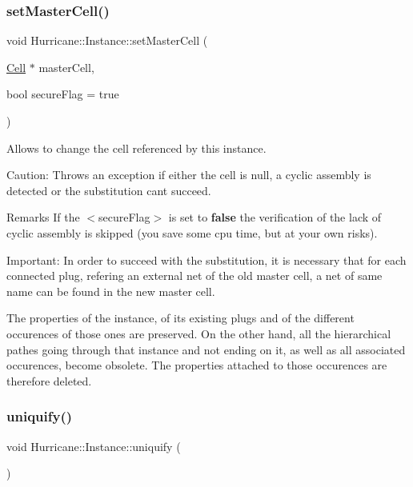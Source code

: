 \subsubsection{\texorpdfstring{set\+Master\+Cell()}{setMasterCell()}}
{\footnotesize\ttfamily void Hurricane\+::\+Instance\+::set\+Master\+Cell (\begin{DoxyParamCaption}\item[{\mbox{\hyperlink{classHurricane_1_1Cell}{Cell}} $\ast$}]{master\+Cell,  }\item[{bool}]{secure\+Flag = {\ttfamily true} }\end{DoxyParamCaption})}

Allows to change the cell referenced by this instance.

\begin{DoxyParagraph}{Caution\+: Throws an exception if either the cell is null, a cyclic }
assembly is detected or the substitution can\textquotesingle{}t succeed.
\end{DoxyParagraph}
\begin{DoxyRemark}{Remarks}
If the {\ttfamily $<$secure\+Flag$>$} is set to {\bfseries false} the verification of the lack of cyclic assembly is skipped (you save some cpu time, but at your own risks).
\end{DoxyRemark}
\begin{DoxyParagraph}{Important\+: In order to succeed with the substitution, it is necessary }
that for each connected plug, refering an external net of the old master cell, a net of same name can be found in the new master cell.
\end{DoxyParagraph}
The properties of the instance, of its existing plugs and of the different occurences of those ones are preserved. On the other hand, all the hierarchical pathes going through that instance and not ending on it, as well as all associated occurences, become obsolete. The properties attached to those occurences are therefore deleted. \mbox{\label{classHurricane_1_1Instance_adf28fcd01f6ff89c5435e83482f66d4c}} 
\subsubsection{\texorpdfstring{uniquify()}{uniquify()}}
{\footnotesize\ttfamily void Hurricane\+::\+Instance\+::uniquify (\begin{DoxyParamCaption}{ }\end{DoxyParamCaption})}

